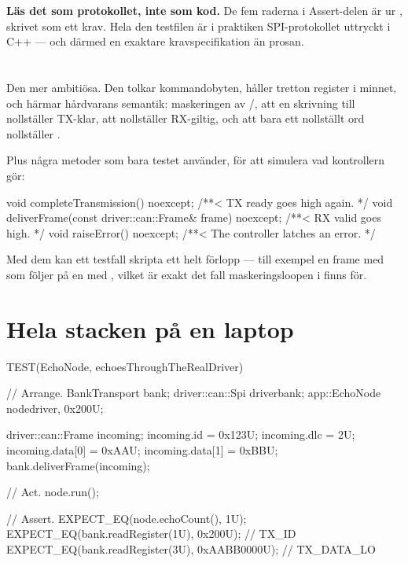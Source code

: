 \textbf{Läs det som protokollet, inte som kod.} De fem raderna i Assert-delen är
 ur , skrivet som ett krav. Hela den testfilen är i praktiken
SPI-protokollet uttryckt i C++ --- och därmed en exaktare kravspecifikation än prosan.

\section{\texorpdfstring{}{BankTransport}}
\label{sec:bank}

Den mer ambitiösa. Den tolkar kommandobyten, håller tretton register i minnet, och härmar
hårdvarans semantik: maskeringen av /, att en skrivning till
 nollställer TX-klar, att  nollställer RX-giltig, och att bara ett
nollställt ord nollställer .

Plus några metoder som bara testet använder, för att simulera vad kontrollern gör:

\begin{cppcode}
void completeTransmission() noexcept;              /**< TX ready goes high again. */
void deliverFrame(const driver::can::Frame& frame) noexcept;  /**< RX valid goes high. */
void raiseError() noexcept;                        /**< The controller latches an error. */
\end{cppcode}

Med dem kan ett testfall skripta ett helt förlopp --- till exempel en frame med  som
följer på en med , vilket är exakt det fall maskeringsloopen i 
finns för.

\section{Hela stacken på en laptop}
\label{sec:wholestack}

\begin{cppcode}
TEST(EchoNode, echoesThroughTheRealDriver)
{
    // Arrange.
    BankTransport bank{};
    driver::can::Spi driver{bank};
    app::EchoNode node{driver, 0x200U};

    driver::can::Frame incoming{};
    incoming.id      = 0x123U;
    incoming.dlc     = 2U;
    incoming.data[0] = 0xAAU;
    incoming.data[1] = 0xBBU;
    bank.deliverFrame(incoming);

    // Act.
    node.run();

    // Assert.
    EXPECT_EQ(node.echoCount(), 1U);
    EXPECT_EQ(bank.readRegister(1U), 0x200U);      // TX_ID
    EXPECT_EQ(bank.readRegister(3U), 0xAABB0000U); // TX_DATA_LO
}
\end{cppcode}

